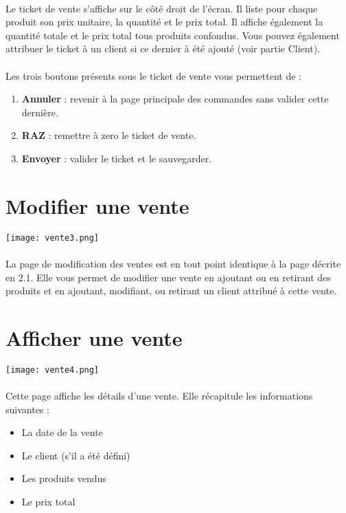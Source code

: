 \paragraph{}
Le ticket de vente s'affiche sur le côté droit de l'écran. Il liste pour chaque
produit son prix unitaire, la quantité et le prix total. Il affiche également
la quantité totale et le prix total tous produits confondus. Vous pouvez
également attribuer le ticket à un client si ce dernier à été ajouté (voir
partie Client). 

\paragraph{}
Les trois boutons présents sous le ticket de vente vous permettent de :
\begin{enumerate}
    \item \textbf{Annuler} : revenir à la page principale des commandes sans
        valider cette dernière.
    \item \textbf{RAZ} : remettre à zero le ticket de vente.
    \item \textbf{Envoyer} : valider le ticket et le sauvegarder.
\end{enumerate}

\section{Modifier une vente}

\texttt{[image: vente3.png]}

\paragraph{}
La page de modification des ventes est en tout point identique à la page décrite en 2.1. Elle vous permet de modifier une vente en ajoutant ou en retirant des produits et en ajoutant, modifiant, ou retirant un client attribué à cette vente.

\section{Afficher une vente}

\texttt{[image: vente4.png]}

\paragraph{}
Cette page affiche les détails d'une vente. Elle récapitule les informations suivantes : 
\begin{itemize}
    \item La date de la vente
    \item Le client (s'il a été défini)
    \item Les produits vendus
    \item Le prix total
\end{itemize}
